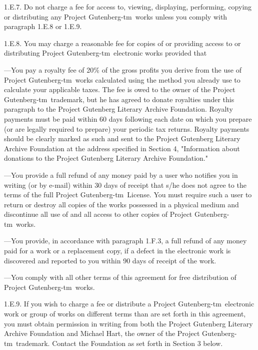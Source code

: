 \documentclass[11pt]{book}
\newcommand{\pgtm}{Project \mbox{Gutenberg-tm}}
\begin{document}
{\smallskip\noindent 1.E.7.  Do not charge a fee for access to, viewing, displaying,
performing, copying or distributing any \pgtm\ works
unless you comply with paragraph 1.E.8 or 1.E.9.

\smallskip\noindent 1.E.8.  You may charge a reasonable fee for copies of or providing
access to or distributing \pgtm\ electronic works provided
that\vspace*{-\smallskipamount}
\begin{list}{}{\setlength{\leftmargin}{2.5em}\setlength{\rightmargin}{0em}
\setlength{\itemindent}{-2.5em}\setlength{\labelwidth}{0em}
\setlength{\labelsep}{0em}\setlength{\parsep}{\smallskipamount}}
\item ---You pay a royalty fee of 20\% of the gross profits you derive from
     the use of \pgtm\ works calculated using the method
     you already use to calculate your applicable taxes.  The fee is
     owed to the owner of the \pgtm\ trademark, but he
     has agreed to donate royalties under this paragraph to the
     Project Gutenberg Literary Archive Foundation.  Royalty payments
     must be paid within 60 days following each date on which you
     prepare (or are legally required to prepare) your periodic tax
     returns.  Royalty payments should be clearly marked as such and
     sent to the Project Gutenberg Literary Archive Foundation at the
     address specified in Section 4, "Information about donations to
     the Project Gutenberg Literary Archive Foundation."
\item ---You provide a full refund of any money paid by a user who notifies
     you in writing (or by e-mail) within 30 days of receipt that s/he
     does not agree to the terms of the full
     \pgtm\ License.  You must require such a user to return or
     destroy all copies of the works possessed in a physical medium
     and discontinue all use of and all access to other copies of
     \pgtm\ works.
\item ---You provide, in accordance with paragraph 1.F.3, a full refund of any
     money paid for a work or a replacement copy, if a defect in the
     electronic work is discovered and reported to you within 90 days
     of receipt of the work.

\item ---You comply with all other terms of this agreement for free
     distribution of \pgtm\ works.
\end{list}
\noindent 1.E.9.  If you wish to charge a fee or distribute a
\pgtm\ electronic work or group of works on different terms than are set
forth in this agreement, you must obtain permission in writing from
both the Project Gutenberg Literary Archive Foundation and Michael
Hart, the owner of the \pgtm\ trademark.  Contact the
Foundation as set forth in Section 3 below.

}
\end{document}
